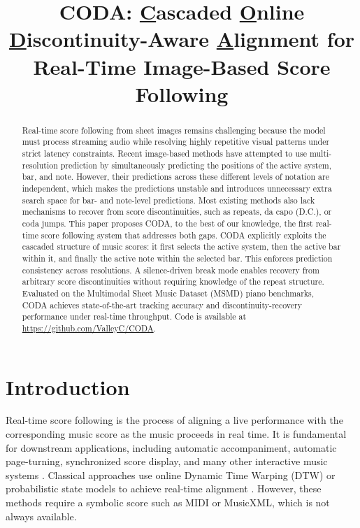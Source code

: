 \documentclass{article}
\title{CODA: \underline{C}ascaded \underline{O}nline \underline{D}iscontinuity-Aware
\underline{A}lignment for Real-Time Image-Based Score Following}
\begin{document}
\maketitle

\begin{abstract}
Real-time score following from sheet images remains challenging because the model must process streaming audio while resolving highly repetitive visual patterns under strict latency constraints. Recent image-based methods have attempted to use multi-resolution prediction by simultaneously predicting the positions of the active system, bar, and note. However, their predictions across these different levels of notation are independent, which makes the predictions unstable and introduces unnecessary extra search space for bar- and note-level predictions. Most existing methods also lack mechanisms to recover from score discontinuities, such as repeats, da capo (D.C.), or coda jumps. This paper proposes CODA, to the best of our knowledge, the first real-time score following system that addresses both gaps. CODA explicitly exploits the cascaded structure of music scores: it first selects the active system, then the active bar within it, and finally the active note within the selected bar. This enforces prediction consistency across resolutions. A silence-driven break mode enables recovery from arbitrary score discontinuities without requiring knowledge of the repeat structure. Evaluated on the Multimodal Sheet Music Dataset (MSMD) piano benchmarks, CODA achieves state-of-the-art tracking accuracy and discontinuity-recovery performance under real-time throughput. Code is available at \url{https://github.com/ValleyC/CODA}.
\end{abstract}

\section{Introduction}\label{sec:introduction}

Real-time score following is the process of aligning a live performance with the corresponding music score as the music proceeds in real time. It is fundamental for downstream applications, including automatic accompaniment, automatic page-turning, synchronized score display, and many other interactive music systems \cite{orio2003score,dannenberg2006music}. Classical approaches use online Dynamic Time Warping (DTW) or probabilistic state models to achieve real-time alignment \cite{dixon2005line,cont2010coupled,nakamura2016real}. However, these methods require a symbolic score such as MIDI or MusicXML, which is not always available.
\end{document}
